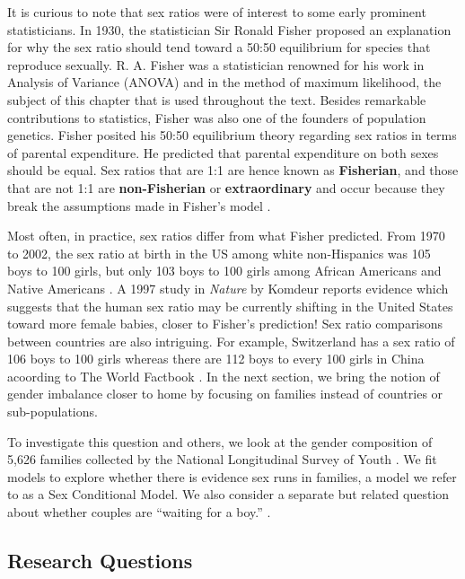 \documentclass[
]{krantz}
\begin{document}
It is curious to note that sex ratios were of interest to some early prominent statisticians. In 1930, the statistician Sir Ronald Fisher proposed an explanation for why the sex ratio should tend toward a 50:50 equilibrium for species that reproduce sexually. R. A. Fisher was a statistician renowned for his work in Analysis of Variance (ANOVA) and in the method of maximum likelihood, the subject of this chapter that is used throughout the text. Besides remarkable contributions to statistics, Fisher was also one of the founders of population genetics. Fisher posited his 50:50 equilibrium theory regarding sex ratios in terms of parental expenditure. He predicted that parental expenditure on both sexes should be equal. Sex ratios that are 1:1 are hence known as \textbf{Fisherian}, and those that are not 1:1 are \textbf{non-Fisherian} or \textbf{extraordinary} and occur because they break the assumptions made in Fisher's model \citep{Rodgers2001}.

Most often, in practice, sex ratios differ from what Fisher predicted. From 1970 to 2002, the sex ratio at birth in the US among white non-Hispanics was 105 boys to 100 girls, but only 103 boys to 100 girls among African Americans and Native Americans \citep{Mathews2005}. A 1997 study in \emph{Nature} by Komdeur reports evidence which suggests that the human sex ratio may be currently shifting in the United States toward more female babies, closer to Fisher's prediction! \citep{Komdeur1997} Sex ratio comparisons between countries are also intriguing. For example, Switzerland has a sex ratio of 106 boys to 100 girls whereas there are 112 boys to every 100 girls in China acoording to The World Factbook \citep{CIA2013}. In the next section, we bring the notion of gender imbalance closer to home by focusing on families instead of countries or sub-populations.

To investigate this question and others, we look at the gender composition of 5,626 families collected by the National Longitudinal Survey of Youth \citep{NLSY1997}. We fit models to explore whether there is evidence sex runs in families, a model we refer to as a Sex Conditional Model. We also consider a separate but related question about whether couples are ``waiting for a boy.'' \citep{Rodgers2001}.

\hypertarget{research-questions}{%
\subsection{Research Questions}\label{research-questions}}
\end{document}
